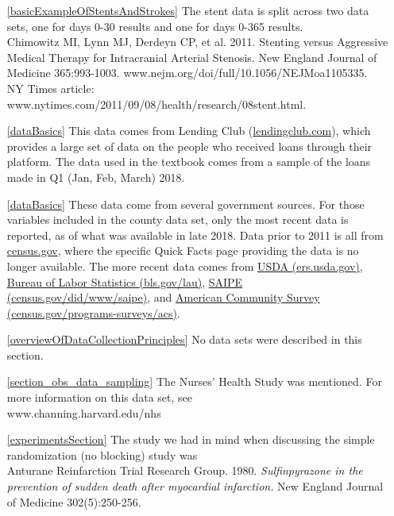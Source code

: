 \begin{itemize}
\item[\ref{basicExampleOfStentsAndStrokes}]
    The stent data is split across two data sets,
    one for days 0-30 results and one for days 0-365
    results. \\
    Chimowitz MI, Lynn MJ, Derdeyn CP, et al. 2011.
    Stenting versus Aggressive Medical Therapy for
    Intracranial Arterial Stenosis.
    New England Journal of Medicine 365:993-1003.
        {www.nejm.org/doi/full/10.1056/NEJMoa1105335}. \\
    NY Times article:
        {www.nytimes.com/2011/09/08/health/research/08stent.html}.

\item[\ref{dataBasics}]
    This data comes from Lending Club
    (\href{https://www.lendingclub.com/info/download-data.action}
        {lendingclub.com}),
    which provides a large set of data on the people who
    received loans through their platform.
    The data used in the textbook comes from a sample
    of the loans made in Q1 (Jan, Feb, March) 2018.
\item[\ref{dataBasics}]
    These data come from several government sources.
    For those variables included in the
    county data set, only the most recent data is reported,
    as of what was available in late 2018.
    Data prior to 2011 is all from
    \href{http://census.gov}{census.gov},
    where the specific Quick Facts page providing the data
    is no longer available.
    The more recent data comes from
    \href{https://www.ers.usda.gov/data-products/county-level-data-sets/download-data/}
        {USDA (ers.usda.gov)},
    \href{https://www.bls.gov/lau/}
        {Bureau of Labor Statistics (bls.gov/lau)},
    \href{https://www.census.gov/did/www/saipe/}
        {SAIPE (census.gov/did/www/saipe)},
    and
    \href{https://www.census.gov/programs-surveys/acs/}
        {American Community Survey
            (census.gov/programs-surveys/acs)}.

\item[\ref{overviewOfDataCollectionPrinciples}]
    No data sets were described in this section.

\item[\ref{section_obs_data_sampling}]
    The Nurses' Health Study was mentioned.
    For more information on this data set, see \\
        {www.channing.harvard.edu/nhs}

\item[\ref{experimentsSection}]
    The study we had in mind when discussing the
    simple randomization (no blocking) study was \\
    Anturane Reinfarction Trial Research Group. 1980.
    \emph{Sulfinpyrazone in the prevention of sudden
    death after myocardial infarction.}
    New England Journal of Medicine 302(5):250-256.
\end{itemize}
